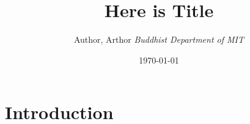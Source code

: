 \documentclass[onecolumn]{article}
\title{\bf{
    Here is Title
}}
\author{
    Author, Arthor
    \quad
    \textit{\quad
        Buddhist Department of MIT
    }}
\date{
    \today
}
\begin{document}
    \maketitle
    \begin{abstract}
        \noindent \lipsum[1-2]
    \end{abstract}

    \section{Introduction}
    \lipsum[1-9]

    \nocite{*}
    \printbibliography
\end{document}
